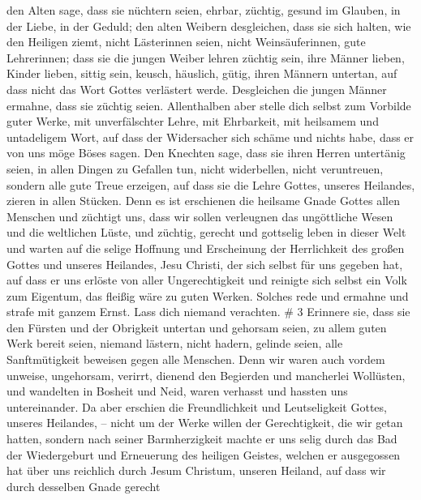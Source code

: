  den Alten sage, dass sie nüchtern seien, ehrbar, züchtig,
gesund im Glauben, in der Liebe, in der Geduld;  den alten
Weibern desgleichen, dass sie sich halten, wie den Heiligen ziemt, nicht
Lästerinnen seien, nicht Weinsäuferinnen, gute Lehrerinnen; 
dass sie die jungen Weiber lehren züchtig sein, ihre Männer lieben,
Kinder lieben,  sittig sein, keusch, häuslich, gütig, ihren
Männern untertan, auf dass nicht das Wort Gottes verlästert werde.
 Desgleichen die jungen Männer ermahne, dass sie züchtig
seien.  Allenthalben aber stelle dich selbst zum Vorbilde
guter Werke, mit unverfälschter Lehre, mit Ehrbarkeit,  mit
heilsamem und untadeligem Wort, auf dass der Widersacher sich schäme und
nichts habe, dass er von uns möge Böses sagen.  Den Knechten
sage, dass sie ihren Herren untertänig seien, in allen Dingen zu
Gefallen tun, nicht widerbellen,  nicht veruntreuen,
sondern alle gute Treue erzeigen, auf dass sie die Lehre Gottes, unseres
Heilandes, zieren in allen Stücken.  Denn es ist erschienen
die heilsame Gnade Gottes allen Menschen  und züchtigt uns,
dass wir sollen verleugnen das ungöttliche Wesen und die weltlichen
Lüste, und züchtig, gerecht und gottselig leben in dieser Welt
 und warten auf die selige Hoffnung und Erscheinung der
Herrlichkeit des großen Gottes und unseres Heilandes, Jesu Christi,
 der sich selbst für uns gegeben hat, auf dass er uns
erlöste von aller Ungerechtigkeit und reinigte sich selbst ein Volk zum
Eigentum, das fleißig wäre zu guten Werken.  Solches rede
und ermahne und strafe mit ganzem Ernst. Lass dich niemand verachten. \#
3  Erinnere sie, dass sie den Fürsten und der Obrigkeit
untertan und gehorsam seien, zu allem guten Werk bereit seien,
 niemand lästern, nicht hadern, gelinde seien, alle
Sanftmütigkeit beweisen gegen alle Menschen.  Denn wir waren
auch vordem unweise, ungehorsam, verirrt, dienend den Begierden und
mancherlei Wollüsten, und wandelten in Bosheit und Neid, waren verhasst
und hassten uns untereinander.  Da aber erschien die
Freundlichkeit und Leutseligkeit Gottes, unseres Heilandes, --
 nicht um der Werke willen der Gerechtigkeit, die wir getan
hatten, sondern nach seiner Barmherzigkeit machte er uns selig durch das
Bad der Wiedergeburt und Erneuerung des heiligen Geistes, 
welchen er ausgegossen hat über uns reichlich durch Jesum Christum,
unseren Heiland,  auf dass wir durch desselben Gnade gerecht
